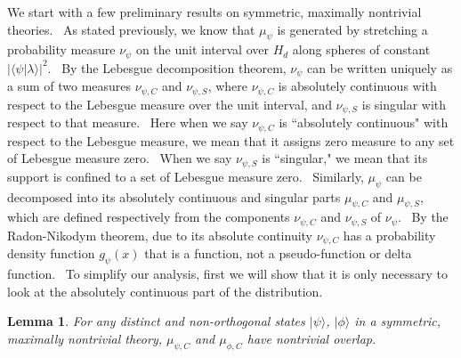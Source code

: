 \documentclass[letterpaper,11pt]{article}
\newtheorem{lem}{Lemma}
\begin{document}
We start with a few preliminary results on symmetric, maximally nontrivial theories. \
As stated previously, we know that $\mu_\psi$ is generated by stretching a
probability measure $\nu_\psi$ on the unit interval over $H_d$ along spheres
of constant $| \langle \psi | \lambda \rangle |^2$. \ By the Lebesgue
decomposition theorem, $\nu_\psi$ can be written uniquely as a sum of two
measures $\nu_{\psi, C}$ and $\nu_{\psi, S}$, where $\nu_{\psi ,C}$ is
absolutely continuous with respect to the Lebesgue measure over the unit
interval, and $\nu_{\psi, S}$ is singular with respect to that measure. \ Here when we say $\nu_{\psi, C}$ is ``absolutely continuous" with respect to the Lebesgue measure, we mean that it assigns zero measure to any set of Lebesgue measure zero. \ When we say $\nu_{\psi, S}$ is ``singular," we mean that its support is confined to a set of Lebesgue measure zero. \ Similarly, $\mu_{\psi}$ can be decomposed into its absolutely continuous and singular parts $\mu_{\psi,C}$ and $\mu_{\psi,S}$, which are defined respectively from the components $\nu_{\psi,C}$ and $\nu_{\psi,S}$ of $\nu_{\psi}$. \ By the Radon-Nikodym theorem, due to its absolute continuity $\nu_{\psi,C}$ has a probability
density function $g_{\psi}(x)$ that is a function, not a
pseudo-function or delta function. \ To simplify our analysis, first we will show that it is only necessary to look at the absolutely
continuous part of the distribution.

\begin{lem}
\label{measure_pos} For any distinct and non-orthogonal states $ | \psi \rangle $, $ | \phi \rangle $ in a
symmetric, maximally nontrivial theory, $\mu_{\psi, C}$ and $\mu_{\phi,C}$ have nontrivial overlap.
\end{lem}
\end{document}
